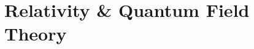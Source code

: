 \documentclass[12pt, a4paper]{report}
\begin{document}
% 
% 
% 
% 
% 
% 
% 
% 
% 
% 
% 
% 
% 
% 
% 
% 

% 
% 
% 
% 
% 
% 
% 
% 

% 
% 
% 
% 

% 
% 
% 
% 
% 
% 

% 
% 
% 
% 

\part{Relativity \& Quantum Field Theory}
% 
% 
% 

% 
% 
% 
% 

% 

% 
% 


\printnomenclature




\printindex
\end{document}
